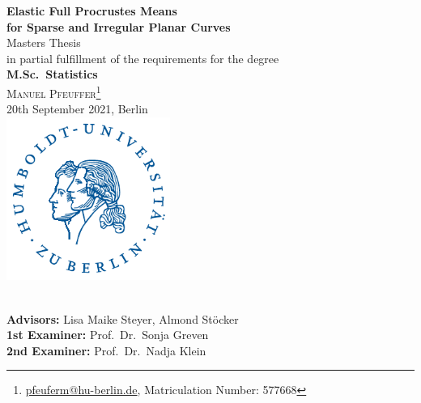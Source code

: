 \documentclass[a4paper,12pt,english,headings=small]{scrreprt}
\begin{document}

\begin{titlepage}
  \vspace*{0.45cm}

  \begin{center}
    {\LARGE\sffamily\textbf{Elastic Full Procrustes Means\vspace{0.33cm}\\
    for Sparse and Irregular Planar Curves}}
  \vspace{1cm}\\
    {\large Masters Thesis}
  \vspace{0.1cm}\\
    in partial fulfillment of the requirements for the degree
  \vspace{0.1cm}\\
    \textbf{M.Sc.\ Statistics}
  \vspace{1.4cm}\\
  \textsc{\large Manuel Pfeuffer\footnote{\url{pfeuferm@hu-berlin.de}, Matriculation Number: 577668}}
  \vspace{0.1cm}\\
  20th September 2021, Berlin
  \vspace{1.8cm}\\
    \includegraphics[width=0.4\textwidth]{graphics/hulogo.pdf}
  \vspace{0.8cm}\\
  \\

  \vfill
  \end{center}

  \noindent \textbf{Advisors:} Lisa Maike Steyer, Almond Stöcker\\
  \noindent \textbf{1st Examiner:} Prof.\ Dr.\ Sonja Greven\\
  \noindent \textbf{2nd Examiner:} Prof.\ Dr.\ Nadja Klein
  \vspace{0.5em}

\end{titlepage}
\end{document}
